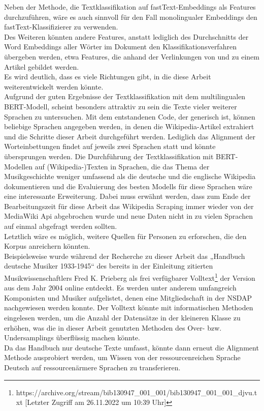 \documentclass[ngerman]{ttlab-qualify}
\begin{document}
Neben der Methode, die Textklassifikation auf fastText-Embeddings als Features durchzuführen, wäre es auch sinnvoll für den Fall monolingualer Embeddings den fastText-Klassifizierer \parencite{fT_classifier} zu verwenden.\\  
Des Weiteren könnten andere Features, anstatt lediglich des Durchschnitts der Word Embeddings aller Wörter im Dokument den Klassifikationsverfahren übergeben werden, etwa Features, die anhand der Verlinkungen von und zu einem Artikel gebildet werden.\\
Es wird deutlich, dass es viele Richtungen gibt, in die diese Arbeit weiterentwickelt werden könnte.\\ Aufgrund der guten Ergebnisse der Textklassifikation mit dem multilingualen BERT-Modell, scheint besonders attraktiv zu sein die Texte vieler weiterer Sprachen zu untersuchen. Mit dem entstandenen Code, der generisch ist, können beliebige Sprachen angegeben werden, in denen die Wikipedia-Artikel extrahiert und die Schritte dieser Arbeit durchgeführt werden. Lediglich das Alignment der Worteinbettungen findet auf jeweils zwei Sprachen statt und könnte übersprungen werden. Die Durchführung der Textklassifikation mit BERT-Modellen auf (Wikipedia-)Texten in Sprachen, die das Thema der Musikgeschichte weniger umfassend als die deutsche und die englische Wikipedia dokumentieren und die Evaluierung des besten Modells für diese Sprachen wäre eine interessante Erweiterung. Dabei muss erwähnt werden, dass zum Ende der Bearbeitungszeit für diese Arbeit das Wikipedia Scraping immer wieder von der MediaWiki Api abgebrochen wurde und neue Daten nicht in zu vielen Sprachen auf einmal abgefragt werden sollten.\\
Letztlich wäre es möglich, weitere Quellen für Personen zu erforschen, die den Korpus anreichern könnten. \\
Beispielsweise wurde während der Recherche zu dieser Arbeit das „Handbuch deutsche Musiker 1933-1945“ des bereits in der Einleitung zitierten Musikwissenschaftlers Fred K. Prieberg als frei verfügbarer Volltext\footnote{https://archive.org/stream/bib130947\_001\_001/bib130947\_001\_001\_djvu.txt [Letzter Zugriff am 26.11.2022 um 10:39 Uhr]} der Version aus dem Jahr 2004 online entdeckt. Es werden unter anderem umfangreich Komponisten und Musiker aufgelistet, denen eine Mitgliedschaft in der NSDAP nachgewiesen werden konnte. Der Volltext könnte mit informatischen Methoden eingelesen werden, um die Anzahl der Datensätze in der kleineren Klasse zu erhöhen, was die in dieser Arbeit genutzten Methoden des Over- bzw. Undersamplings überflüssig machen könnte.\\
Da das Handbuch nur deutsche Texte umfasst, könnte dann erneut die Alignment Methode ausprobiert werden, um Wissen von der ressourcenreichen Sprache Deutsch auf ressourcenärmere Sprachen zu transferieren.
\end{document}
